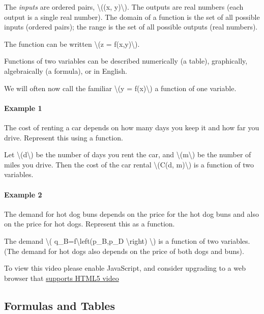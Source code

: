 The \emph{inputs} are ordered pairs, \textbackslash{}((x,
y)\textbackslash{}). The outputs are real numbers (each output is a
single real number). The domain of a function is the set of all possible
inputs (ordered pairs); the range is the set of all possible outputs
(real numbers).

The function can be written \textbackslash{}(z =
f(x,y)\textbackslash{}).

Functions of two variables can be described numerically (a table),
graphically, algebraically (a formula), or in English.

We will often now call the familiar \textbackslash{}(y =
f(x)\textbackslash{}) a function of one variable.

\hypertarget{example-1}{%
\paragraph{Example 1}\label{example-1}}

The cost of renting a car depends on how many days you keep it and how
far you drive. Represent this using a function.

Let \textbackslash{}(d\textbackslash{}) be the number of days you rent
the car, and \textbackslash{}(m\textbackslash{}) be the number of miles
you drive. Then the cost of the car rental \textbackslash{}(C(d,
m)\textbackslash{}) is a function of two variables.

\hypertarget{example-2}{%
\paragraph{Example 2}\label{example-2}}

The demand for hot dog buns depends on the price for the hot dog buns
and also on the price for hot dogs. Represent this as a function.

The demand \textbackslash{}( q\_B=f\textbackslash{}left(p\_B,p\_D
\textbackslash{}right) \textbackslash{}) is a function of two variables.
(The demand for hot dogs also depends on the price of both dogs and
buns).

To view this video please enable JavaScript, and consider upgrading to a
web browser that \href{http://videojs.com/html5-video-support/}{supports
HTML5 video}

\hypertarget{formulas-and-tables}{%
\subsection{Formulas and Tables}\label{formulas-and-tables}}


